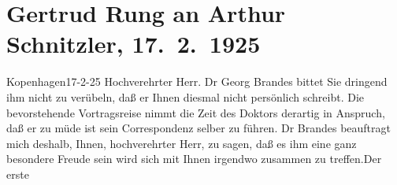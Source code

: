 

         
         \renewcommand{\erwaehntePersonen}{Personen: Georg Brandes, Alfons Fedor Cohn, Gertrud Rung, J.  Span}
         \renewcommand{\erwaehnteOrte}{Orte: Berlin, Blüthner-Saal, Kopenhagen, Straße des 17. Juni, Wien}
         \renewcommand{\erwaehnteWerke}{Werke: Berliner Tageblatt, Das heutige Europa, Georg Brandes in Berlin}
               \section[Gertrud Rung an Arthur Schnitzler, 17. 2. 1925]{ Gertrud Rung an Arthur Schnitzler, 17. 2. 1925}\nopagebreak{}\rehead{ }\begin{ledgroupsized}[t]{13cm}\normalsize\beginnumbering \toendnotes[C]{\smallbreak\pagebreak[2]} 
\toendnotes[C]{\smallbreak}\pstart
           \raggedleft{}{\pb}Kopenhagen17-2-25\pend
           \pstart{}Hochverehrter Herr.\pend\pstart
           Dr Georg Brandes bittet Sie dringend ihm nicht
               zu verübeln, daß er Ihnen diesmal nicht persönlich schreibt. Die bevorstehende
               Vortragsreise nimmt die Zeit des Doktors derartig in Anspruch, daß er zu müde ist
               sein Correspondenz selber zu führen.\pend
           \pstart
           Dr Brandes beauftragt mich deshalb, Ihnen,
               hochverehrter Herr, zu sagen, daß es ihm eine ganz besondere Freude sein wird sich
               mit Ihnen irgendwo zusammen zu treffen.\hspace*{1.5em}Der erste

\end{ledgroupsized}
